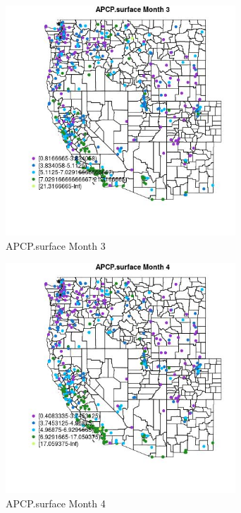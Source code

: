 \begin{figure} 
\centering  
\includegraphics[width=0.77\textwidth]{Code_Outputs/ML_input_report_ML_input_PM25_Step5_part_d_de_duplicated_aves_ML_input_MapObsMo3APCPsurface.jpg} 
\caption{\label{fig:ML_input_report_ML_input_PM25_Step5_part_d_de_duplicated_aves_ML_inputMapObsMo3APCPsurface}APCP.surface Month 3} 
\end{figure} 
 

\begin{figure} 
\centering  
\includegraphics[width=0.77\textwidth]{Code_Outputs/ML_input_report_ML_input_PM25_Step5_part_d_de_duplicated_aves_ML_input_MapObsMo4APCPsurface.jpg} 
\caption{\label{fig:ML_input_report_ML_input_PM25_Step5_part_d_de_duplicated_aves_ML_inputMapObsMo4APCPsurface}APCP.surface Month 4} 
\end{figure} 
 

